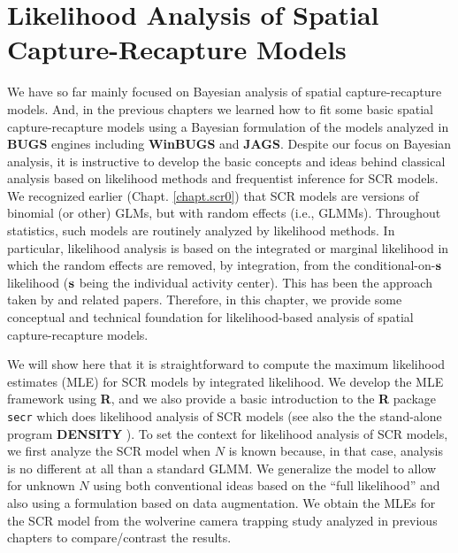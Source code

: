 \chapter{
Likelihood Analysis of Spatial Capture-Recapture Models
}
\label{chapt.mle}

\vspace{.3in}

We have so far mainly focused on Bayesian analysis of spatial
capture-recapture models. And, in the previous chapters we learned how
to fit some basic spatial capture-recapture models using a Bayesian
formulation of the models analyzed in {\bf BUGS} engines including
{\bf WinBUGS} and {\bf JAGS}.  Despite our focus on Bayesian analysis,
it is instructive to develop the basic concepts and ideas behind
classical analysis based on likelihood methods and frequentist
inference for SCR models.  We recognized earlier
(Chapt. \ref{chapt.scr0}) that SCR models are versions of binomial (or
other) GLMs, but with random effects (i.e., GLMMs).  Throughout
statistics, such models are routinely analyzed by likelihood
methods. In particular, likelihood analysis is based on the integrated
or marginal likelihood in which the random effects are removed, by
integration, from the conditional-on-${\bf s}$ likelihood (${\bf s}$
being the individual activity center).  This has been the approach
taken by \citet{borchers_efford:2008, dawson_efford:2009} and related
papers.  Therefore, in this chapter, we provide some conceptual and
technical foundation for likelihood-based analysis of spatial
capture-recapture models.



We will show here that it is straightforward to compute the maximum
likelihood estimates (MLE) for SCR models by integrated likelihood. We
develop the MLE framework using {\bf R}, and we also provide a basic
introduction to the {\bf R} package \mbox{\tt secr}
\citep{efford:2011} which does likelihood analysis of SCR models (see
also the the stand-alone program {\bf DENSITY}
\citep{efford_etal:2004}).  To set the context for likelihood analysis
of SCR models, we first analyze the SCR model when $N$ is known
because, in that case, analysis is no different at all than a standard
GLMM.  We generalize the model to allow for unknown $N$ using both
conventional ideas based on the ``full likelihood''
\citep[e.g.,][]{borchers_etal:2002} and also using a formulation based
on data augmentation.  We obtain the MLEs for the SCR model from the
wolverine camera trapping study \citep{magoun_etal:2011} analyzed in
previous chapters to compare/contrast the results.

